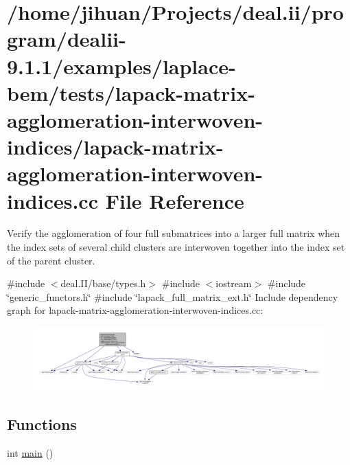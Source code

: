 \hypertarget{lapack-matrix-agglomeration-interwoven-indices_8cc}{}\section{/home/jihuan/\+Projects/deal.ii/program/dealii-\/9.1.1/examples/laplace-\/bem/tests/lapack-\/matrix-\/agglomeration-\/interwoven-\/indices/lapack-\/matrix-\/agglomeration-\/interwoven-\/indices.cc File Reference}
\label{lapack-matrix-agglomeration-interwoven-indices_8cc}


Verify the agglomeration of four full submatrices into a larger full matrix when the index sets of several child clusters are interwoven together into the index set of the parent cluster.  


{\ttfamily \#include $<$deal.\+I\+I/base/types.\+h$>$}\newline
{\ttfamily \#include $<$iostream$>$}\newline
{\ttfamily \#include \char`\"{}generic\+\_\+functors.\+h\char`\"{}}\newline
{\ttfamily \#include \char`\"{}lapack\+\_\+full\+\_\+matrix\+\_\+ext.\+h\char`\"{}}\newline
Include dependency graph for lapack-\/matrix-\/agglomeration-\/interwoven-\/indices.cc\+:
\nopagebreak
\begin{figure}[H]
\begin{center}
\leavevmode
\includegraphics[width=350pt]{lapack-matrix-agglomeration-interwoven-indices_8cc__incl}
\end{center}
\end{figure}
\subsection*{Functions}
\begin{DoxyCompactItemize}
\item 
int \hyperlink{lapack-matrix-agglomeration-interwoven-indices_8cc_ae66f6b31b5ad750f1fe042a706a4e3d4}{main} ()
\end{DoxyCompactItemize}


